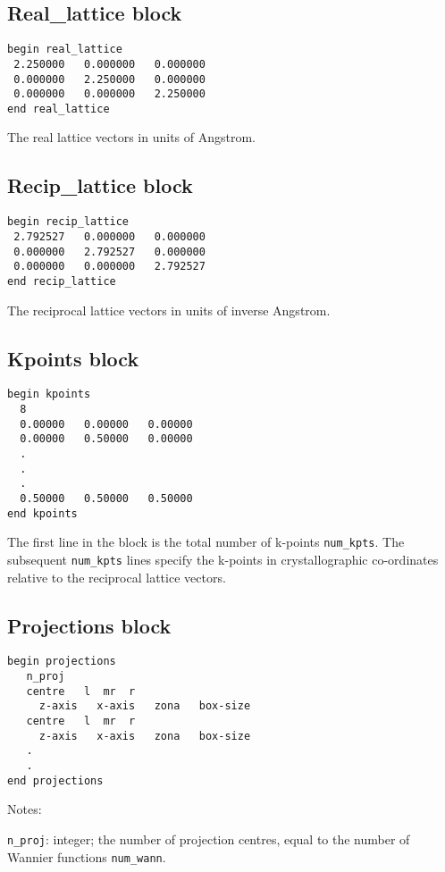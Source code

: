 \subsection{Real\_lattice block}
\begin{verbatim}
begin real_lattice
 2.250000   0.000000   0.000000
 0.000000   2.250000   0.000000
 0.000000   0.000000   2.250000
end real_lattice
\end{verbatim}

The real lattice vectors in units of Angstrom.


\subsection{Recip\_lattice block}
\begin{verbatim}
begin recip_lattice
 2.792527   0.000000   0.000000
 0.000000   2.792527   0.000000
 0.000000   0.000000   2.792527
end recip_lattice
\end{verbatim}

The reciprocal lattice vectors in units of inverse Angstrom.


\subsection{Kpoints block}
\begin{verbatim}
begin kpoints
  8
  0.00000   0.00000   0.00000
  0.00000   0.50000   0.00000
  .
  .
  .
  0.50000   0.50000   0.50000
end kpoints
\end{verbatim}

The first line in the block is the total number of k-points
\verb#num_kpts#. The subsequent \verb#num_kpts# lines specify the
k-points in crystallographic co-ordinates relative to the reciprocal
lattice vectors.


\subsection{Projections block}
\begin{verbatim}
begin projections
   n_proj
   centre   l  mr  r   
     z-axis   x-axis   zona   box-size   
   centre   l  mr  r   
     z-axis   x-axis   zona   box-size   
   .
   .
end projections
\end{verbatim}

\noindent
Notes:

\verb#n_proj#: integer; the number of projection centres, equal to the
number of Wannier functions \verb#num_wann#.

